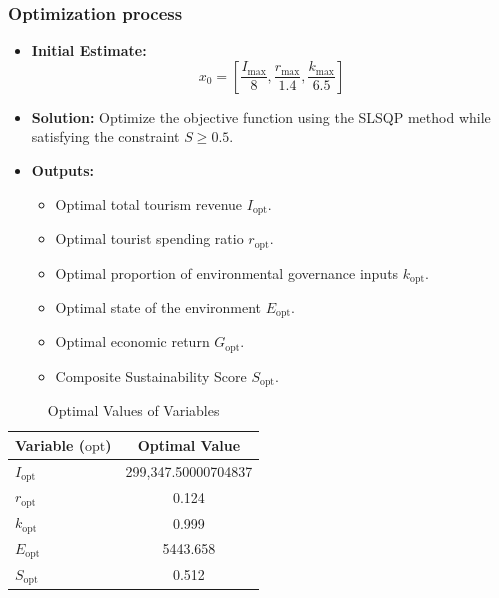 \documentclass[UTF8]{mcmthesis}
\begin{document}
        \subsubsection{Optimization process}

        \begin{itemize}
            \item \textbf{Initial Estimate:} 
            \[
            x_0 = \left[ \frac{I_{\text{max}}}{8}, \frac{r_{\text{max}}}{1.4}, \frac{k_{\text{max}}}{6.5} \right]
            \]
            \item \textbf{Solution:} Optimize the objective function using the SLSQP method while satisfying the constraint \( S \geq 0.5 \).
            \item \textbf{Outputs:}
            \begin{itemize}
                \item Optimal total tourism revenue  \( I_{\text{opt}} \).
                \item Optimal tourist spending ratio \( r_{\text{opt}} \).
                \item Optimal proportion of environmental governance inputs \( k_{\text{opt}} \).
                \item Optimal state of the environment \( E_{\text{opt}} \).
                \item Optimal economic return \( G_{\text{opt}} \).
                \item Composite Sustainability Score \( S_{\text{opt}} \).
            \end{itemize}
        \end{itemize}
        
        \begin{table}[htbp]
            \centering
            \caption{Optimal Values of Variables}
            \begin{tabular}{lc}
                \toprule
                \textbf{Variable (\( \text{opt} \))} & \textbf{Optimal Value} \\
                \midrule
                \( I_{\text{opt}} \) & 299,347.50000704837 \\
                \( r_{\text{opt}} \) & 0.124 \\
                \( k_{\text{opt}} \) & 0.999 \\
                \( E_{\text{opt}} \) & 5443.658 \\
                \( S_{\text{opt}} \) & 0.512 \\
                \bottomrule
            \end{tabular}
            \label{tab:optimal_values}
        \end{table}
        
\end{document}
